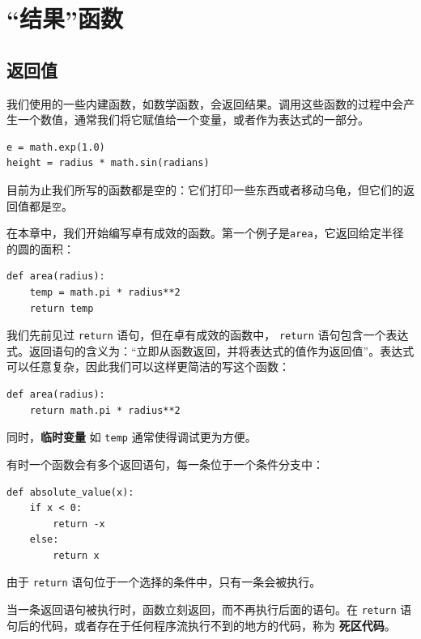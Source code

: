 
\chapter{ “结果”函数}

\label{fruitchap}

\section{返回值}

我们使用的一些内建函数，如数学函数，会返回结果。调用这些函数的过程中会产生一个数值，通常我们将它赋值给一个变量，或者作为表达式的一部分。

\beforeverb
\begin{verbatim}
e = math.exp(1.0)
height = radius * math.sin(radians)
\end{verbatim}
\afterverb
%
目前为止我们所写的函数都是空的：它们打印一些东西或者移动乌龟，但它们的返回值都是{\tt 空}。

在本章中，我们开始编写卓有成效的函数。第一个例子是{\tt area}，它返回给定半径的圆的面积：

\beforeverb
\begin{verbatim}
def area(radius):
    temp = math.pi * radius**2
    return temp
\end{verbatim}
\afterverb
%
我们先前见过  {\tt return} 语句，但在卓有成效的函数中， {\tt return} 语句包含一个表达式。返回语句的含义为：“立即从函数返回，并将表达式的值作为返回值”。表达式可以任意复杂，因此我们可以这样更简洁的写这个函数：


\beforeverb
\begin{verbatim}
def area(radius):
    return math.pi * radius**2
\end{verbatim}
\afterverb
%
同时，{\bf 临时变量} 如 {\tt temp} 通常使得调试更为方便。


有时一个函数会有多个返回语句，每一条位于一个条件分支中：

\beforeverb
\begin{verbatim}
def absolute_value(x):
    if x < 0:
        return -x
    else:
        return x
\end{verbatim}
\afterverb
%
由于 {\tt return} 语句位于一个选择的条件中，只有一条会被执行。

当一条返回语句被执行时，函数立刻返回，而不再执行后面的语句。在 {\tt return} 语句后的代码，或者存在于任何程序流执行不到的地方的代码，称为 {\bf 死区代码}。

